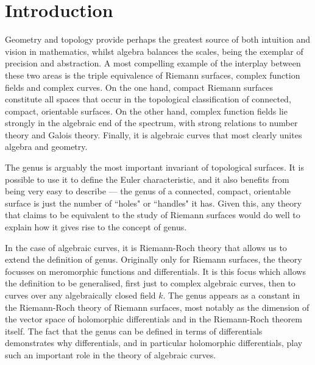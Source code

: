 \chapter{Introduction} \label{Chapter:introduction}


Geometry and topology provide perhaps the greatest source of both intuition and vision in mathematics, whilst algebra balances the scales, being the exemplar of precision and abstraction. 
A most compelling example of the interplay between these two areas is the triple equivalence of Riemann surfaces, complex function fields and complex curves.
On the one hand, compact Riemann surfaces constitute all spaces that occur in the topological classification of connected, compact, orientable surfaces.
On the other hand, complex function fields lie strongly in the algebraic end of the spectrum, with strong relations to number theory and Galois theory.
Finally, it is algebraic curves that most clearly unites algebra and geometry.

The genus is arguably the most important invariant of topological surfaces.
It is possible to use it to define the Euler characteristic, and it also benefits from being very easy to describe --- the genus of a connected, compact, orientable surface is just the number of ``holes" or ``handles" it has.
Given this, any theory that claims to be equivalent to the study of Riemann surfaces would do well to explain how it gives rise to the concept of genus.

In the case of algebraic curves, it is Riemann-Roch theory that allows us to extend the definition of genus.
Originally only for Riemann surfaces, the theory focusses on meromorphic functions and differentials.
It is this focus which allows the definition to be generalised, first just to complex algebraic curves, then to curves over any algebraically closed field $k$.
The genus appears as a constant in the Riemann-Roch theory of Riemann surfaces, most notably as the dimension of the vector space of holomorphic differentials and in the Riemann-Roch theorem itself.
The fact that the genus can be defined in terms of differentials demonstrates why differentials, and in particular holomorphic differentials, play such an important role in the theory of algebraic curves.

